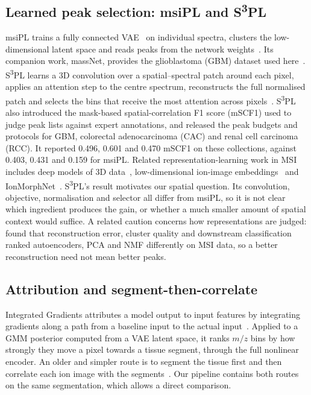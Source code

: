 \subsection{Learned peak selection: msiPL and S\textsuperscript{3}PL}
msiPL trains a fully connected VAE~\citep{kingma2014autoencoding} on
individual spectra, clusters the low-dimensional latent space and reads peaks
from the network weights~\citep{abdelmoula2021peak}. Its companion work,
massNet, provides the glioblastoma (GBM) dataset used
here~\citep{abdelmoula2022massnet}. S\textsuperscript{3}PL learns a 3D convolution over a
spatial--spectral patch around each pixel, applies an attention step to the centre
spectrum, reconstructs the full normalised patch and selects the bins that
receive the most attention across pixels~\citep{weigand2026spatial}. S\textsuperscript{3}PL also
introduced the mask-based spatial-correlation F1 score (mSCF1) used to judge
peak lists against expert annotations, and released the peak budgets and
protocols for GBM, colorectal adenocarcinoma (CAC) and renal cell carcinoma
(RCC). It reported 0.496, 0.601 and 0.470 mSCF1 on these collections, against
0.403, 0.431 and 0.159 for msiPL. Related representation-learning work in MSI
includes deep models of 3D data~\citep{inglese2017deep}, low-dimensional
ion-image embeddings~\citep{guo2024deepion} and IonMorphNet~\citep{weigand2026ionmorphnet}.
S\textsuperscript{3}PL's result motivates our spatial question. Its convolution, objective,
normalisation and selector all differ from msiPL, so it is not clear which
ingredient produces the gain, or whether a much smaller amount of spatial
context would suffice. A related caution concerns how representations are judged:
\citet{mazarura2025autoencoder} found that reconstruction error, cluster
quality and downstream classification ranked autoencoders, PCA and NMF
differently on MSI data, so a better reconstruction need not mean better peaks.

\subsection{Attribution and segment-then-correlate}
Integrated Gradients attributes a model output to input features by
integrating gradients along a path from a baseline input to the actual
input~\citep{sundararajan2017axiomatic}. Applied to a GMM posterior computed
from a VAE latent space, it ranks $m/z$ bins by how strongly they move a pixel
towards a tissue segment, through the full nonlinear encoder. An older and
simpler route is to segment the tissue first and then correlate each ion image
with the segments~\citep{alexandrov2010spatial,alexandrov2011efficient}. Our
pipeline contains both routes on the same segmentation, which allows a direct
comparison.

